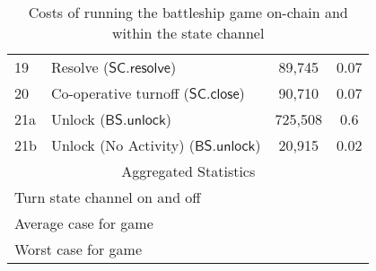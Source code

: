 \documentclass{llncs}
\newcommand{\statechannelresolve}{\mathsf{SC}.\mathsf{resolve}}
\newcommand{\statechannelclose}{\mathsf{SC}.\mathsf{close}}
\newcommand{\battleshipunlock}{\mathsf{BS.unlock}}
\begin{document}
\begin{table}
\begin{tabular}[]{l l c c}
		19 & Resolve ($\statechannelresolve$) &89,745 & 0.07 \\
		20 & Co-operative turnoff ($\statechannelclose$) & 90,710 & 0.07 \\
		21a & Unlock ($\battleshipunlock$) & 725,508 & 0.6 \\
		21b & Unlock (No Activity) ($\battleshipunlock$) & 20,915 & 0.02 \\
		\hline
		\multicolumn{4}{c}{Aggregated Statistics} \\
		\hline
		\multicolumn{2}{l}{Turn state channel on and off} &  & \\
		\multicolumn{2}{l}{Average case for game} &  & \\
		\multicolumn{2}{l}{Worst case for game} &  &  \\
		\hline 
	\end{tabular}
	
	\caption{Costs of running the battleship game on-chain and within the state channel}\label{tab:costs}
\end{table}
\end{document}
